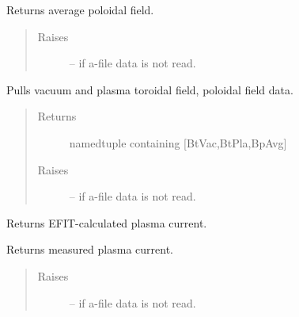 \documentclass[letterpaper,10pt,english]{sphinxmanual}
\begin{document}
\begin{fulllineitems}
\begin{fulllineitems}
\label{eqtools:eqtools.eqdskreader.EqdskReader.getBpAvg}
Returns average poloidal field.
\begin{quote}\begin{description}
\item[{Raises }] \leavevmode
{} -- 
if a-file data is not read.

\end{description}\end{quote}

\end{fulllineitems}


\begin{fulllineitems}
\label{eqtools:eqtools.eqdskreader.EqdskReader.getFields}
Pulls vacuum and plasma toroidal field, poloidal field data.
\begin{quote}\begin{description}
\item[{Returns}] \leavevmode
namedtuple containing {[}BtVac,BtPla,BpAvg{]}

\item[{Raises }] \leavevmode
{} -- 
if a-file data is not read.

\end{description}\end{quote}

\end{fulllineitems}


\begin{fulllineitems}
\label{eqtools:eqtools.eqdskreader.EqdskReader.getIpCalc}
Returns EFIT-calculated plasma current.

\end{fulllineitems}


\begin{fulllineitems}
\label{eqtools:eqtools.eqdskreader.EqdskReader.getIpMeas}
Returns measured plasma current.
\begin{quote}\begin{description}
\item[{Raises }] \leavevmode
{} -- 
if a-file data is not read.


\end{description}
\end{quote}
\end{fulllineitems}
\end{fulllineitems}
\end{document}
